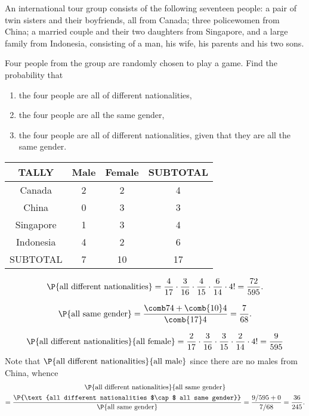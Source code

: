 \begin{problem}
    An international tour group consists of the following seventeen people: a pair of twin sisters and their boyfriends, all from Canada; three policewomen from China; a married couple and their two daughters from Singapore, and a large family from Indonesia, consisting of a man, his wife, his parents and his two sons.

    Four people from the group are randomly chosen to play a game. Find the probability that
    \begin{enumerate}
        \item the four people are all of different nationalities,
        \item the four people are all the same gender,
        \item the four people are all of different nationalities, given that they are all the same gender.
    \end{enumerate}
\end{problem}
\begin{solution}
    \begin{table}[H]
        \centering
        \begin{tabular}{|c|c|c|c|}
        \hline TALLY & Male & Female & SUBTOTAL \\\hline\hline
        Canada & 2 & 2 & 4 \\\hline
        China & 0 & 3 & 3 \\\hline
        Singapore & 1 & 3 & 4 \\\hline
        Indonesia & 4 & 2 & 6 \\\hline
        SUBTOTAL & 7 & 10 & 17\\\hline
        \end{tabular}
    \end{table}

    \begin{ppart}
        \[\P{\text{all different nationalities}} = \frac{4}{17} \cdot \frac{3}{16} \cdot \frac{4}{15} \cdot \frac{6}{14} \cdot 4! = \frac{72}{595}.\]
    \end{ppart}
    \begin{ppart}
        \[\P{\text{all same gender}} = \frac{\comb74 + \comb{10}4}{\comb{17}4} = \frac7{68}.\]
    \end{ppart}
    \begin{ppart}
        \[\P{\text{all different nationalities}}{\text{all female}} = \frac2{17} \cdot \frac{3}{16} \cdot \frac{3}{15} \cdot \frac2{14} \cdot 4! = \frac{9}{595}\]
        Note that $\P{\text{all different nationalities}}{\text{all male}}$ since there are no males from China, whence
        \begin{gather*}
            \P{\text{all different nationalities}}{\text{all same gender}}\\
            = \frac{\P{\text{all different nationalities $\cap$ all same gender}}}{\P{\text{all same gender}}} = \frac{9/595 + 0}{7/68} = \frac{36}{245}.
        \end{gather*}
    \end{ppart}
\end{solution}